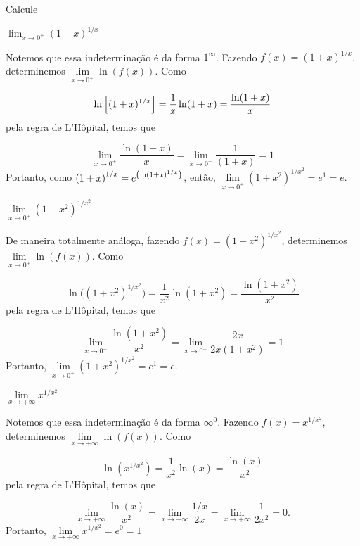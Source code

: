 \cleardoublepage\documentclass[../main.tex]{subfiles}
\begin{document}
\begin{exeresol}

  Calcule
  \begin{compactenum}[a)]
  \item $  \lim_{x\to 0^+} (1+x)^{1/x}$\\

  
\begin{resol}
Notemos que essa indeterminação é da forma \(1^\infty\). Fazendo \(f(x)=(1+x)^{1/x}\), determinemos \(\lim\limits_{x\to 0^+}\ln(f(x))\). Como

\[ \ln \left[(1+x)^{1/x}\right]=\dfrac{1}{x}\ln(1+x)=\dfrac{\ln(1+x)}{x} \]
pela regra de L’Hôpital, temos que

\[ \lim\limits_{x\to 0^+}\dfrac{\ln(1+x)}{x}=\lim\limits_{x\to 0^+}\dfrac{1}{(1+x)}=1 \]
Portanto, como $\left(1+x\right)^{1/x}=e^{\left(\ln \left(1+x\right)^{1/x}\right)}$, então, \(\lim\limits_{x\to 0^+}(1+x^2)^{1/x^2}=e^1=e\).
\end{resol}
\item \(\lim\limits_{x\to 0^+}(1+x^2)^{1/x^2}\)\\

\begin{resol}
De maneira totalmente análoga, fazendo \(f(x)=(1+x^2)^{1/x^2}\), determinemos \(\lim\limits_{x\to 0^+}\ln(f(x))\). Como

\[ \ln\big((1+x^2)^{1/x^2}\big)=\dfrac{1}{x^2}\ln(1+x^2)=\dfrac{\ln(1+x^2)}{x^2} \]
pela regra de L’Hôpital, temos que

\[ \lim\limits_{x\to 0^+}\dfrac{\ln(1+x^2)}{x^2}=\lim\limits_{x\to 0^+}\dfrac{2x}{2x(1+x^2)}=1 \]
Portanto, \(\lim\limits_{x\to 0^+}(1+x^2)^{1/x^2}=e^1=e\).
\end{resol}

\item \(\lim\limits_{x\to +\infty}x^{1/x^2}\)\\

\begin{resol}
  Notemos que essa indeterminação é da forma \(\infty^0\). Fazendo \(f(x)=x^{1/x^2}\), determinemos \(\lim\limits_{x\to +\infty}\ln(f(x))\). Como

\[ \ln(x^{1/x^2})=\dfrac{1}{x^2}\ln(x)=\dfrac{\ln(x)}{x^2} \]
pela regra de L’Hôpital, temos que

\[ \lim\limits_{x\to +\infty}\dfrac{\ln(x)}{x^2}=\lim\limits_{x\to +\infty}\dfrac{1/x}{2x}=\lim\limits_{x\to +\infty}\dfrac{1}{2x^2}=0. \]
Portanto, \(\lim\limits_{x\to +\infty}x^{1/x^2}=e^0=1\)
\end{resol}
  \end{compactenum}
\end{exeresol}
\end{document}
